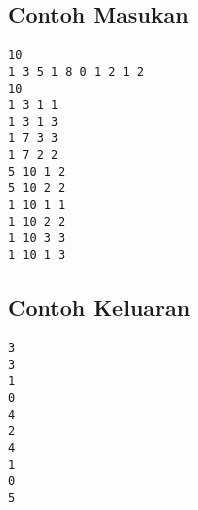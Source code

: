 \documentclass{article}
\begin{document}
\begin{multicols}{2}
\subsection*{Contoh Masukan}
\begin{lstlisting}
10
1 3 5 1 8 0 1 2 1 2
10
1 3 1 1
1 3 1 3
1 7 3 3
1 7 2 2
5 10 1 2
5 10 2 2
1 10 1 1
1 10 2 2
1 10 3 3
1 10 1 3
\end{lstlisting}
\columnbreak
\subsection*{Contoh Keluaran}
\begin{lstlisting}
3
3
1
0
4
2
4
1
0
5
\end{lstlisting}
\vfill
\null
\end{multicols}


\pagebreak
\end{document}
